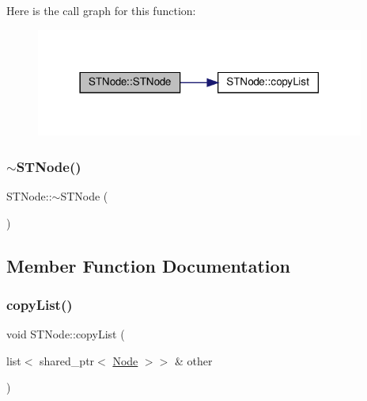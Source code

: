 Here is the call graph for this function\+:\nopagebreak
\begin{figure}[H]
\begin{center}
\leavevmode
\includegraphics[width=306pt]{d0/d75/class_s_t_node_abc48151a02b70b445ef9c4e5066c1fe8_cgraph}
\end{center}
\end{figure}
\mbox{\label{class_s_t_node_a535f7a100908f02b166cb54124dfbea3}} 
\subsubsection{\texorpdfstring{$\sim$\+S\+T\+Node()}{~STNode()}}
{\footnotesize\ttfamily S\+T\+Node\+::$\sim$\+S\+T\+Node (\begin{DoxyParamCaption}{ }\end{DoxyParamCaption})}



\subsection{Member Function Documentation}
\mbox{\label{class_s_t_node_a55d1f2a5254f3ef8ec9f0f5023177798}} 
\subsubsection{\texorpdfstring{copy\+List()}{copyList()}}
{\footnotesize\ttfamily void S\+T\+Node\+::copy\+List (\begin{DoxyParamCaption}\item[{list$<$ shared\+\_\+ptr$<$ \hyperlink{class_node}{Node} $>$$>$ \&}]{other }\end{DoxyParamCaption})\hspace{0.3cm}{\ttfamily [private]}}

